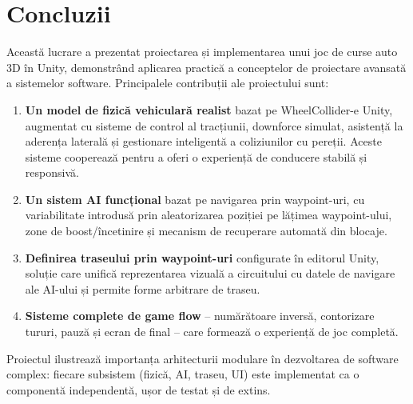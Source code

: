 \section{Concluzii}
\label{sec:conclusion}

Această lucrare a prezentat proiectarea și implementarea unui joc de curse auto 3D în Unity, demonstrând aplicarea practică a conceptelor de proiectare avansată a sistemelor software. Principalele contribuții ale proiectului sunt:

\begin{enumerate}
    \item \textbf{Un model de fizică vehiculară realist} bazat pe WheelCollider-e Unity, augmentat cu sisteme de control al tracțiunii, downforce simulat, asistență la aderența laterală și gestionare inteligentă a coliziunilor cu pereții. Aceste sisteme cooperează pentru a oferi o experiență de conducere stabilă și responsivă.
    
    \item \textbf{Un sistem AI funcțional} bazat pe navigarea prin waypoint-uri, cu variabilitate introdusă prin aleatorizarea poziției pe lățimea waypoint-ului, zone de boost/încetinire și mecanism de recuperare automată din blocaje.
    
    \item \textbf{Definirea traseului prin waypoint-uri} configurate în editorul Unity, soluție care unifică reprezentarea vizuală a circuitului cu datele de navigare ale AI-ului și permite forme arbitrare de traseu.

    \item \textbf{Sisteme complete de game flow} -- numărătoare inversă, contorizare tururi, pauză și ecran de final -- care formează o experiență de joc completă.
\end{enumerate}

Proiectul ilustrează importanța arhitecturii modulare în dezvoltarea de software complex: fiecare subsistem (fizică, AI, traseu, UI) este implementat ca o componentă independentă, ușor de testat și de extins.
